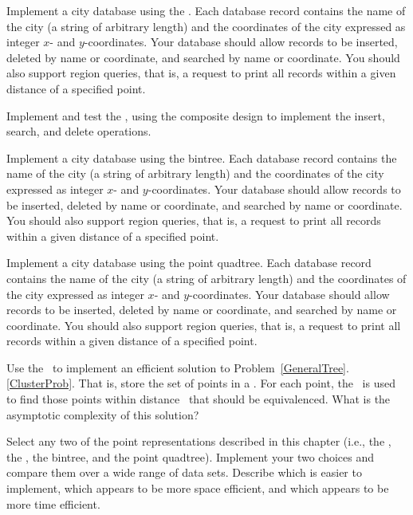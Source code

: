 \begin{projects}
\item
Implement a city database using the
\PRquad.
Each database record contains the name of the city (a string of
arbitrary length) and the coordinates of the city expressed as integer
$x$- and $y$-coordinates.
Your database should allow records to be inserted, deleted by name or
coordinate, and searched by name or coordinate.
You should also support region queries, that is, a request to print
all records within a given distance of a specified point.

\item
Implement and test the \PRquad, using the composite design to
implement the insert, search, and delete operations.

\item
Implement a city database using the
bintree.
Each database record contains the name of the city (a string of
arbitrary length) and the coordinates of the city expressed as integer
$x$- and $y$-coordinates.
Your database should allow records to be inserted, deleted by name or
coordinate, and searched by name or coordinate.
You should also support region queries, that is, a request to print
all records within a given distance of a specified point.

\item
Implement a city database using the
point quadtree.
Each database record contains the name of the city (a string of
arbitrary length) and the coordinates of the city expressed as integer
$x$- and $y$-coordinates.
Your database should allow records to be inserted, deleted by name or
coordinate, and searched by name or coordinate.
You should also support region queries, that is, a request to print
all records within a given distance of a specified point.

\item
Use the \PRquad\ to implement an efficient solution
to
Problem~\ref{GeneralTree}.\ref{ClusterProb}.
That is, store the set of points in a \PRquad.
For each point, the \PRquad\ is used to find those points within
distance~ that should be equivalenced.
What is the asymptotic complexity of this solution?

\item
Select any two of the point representations described in this chapter
(i.e., the \KDtree, the \PRquad, the bintree, and the point quadtree).
Implement your two choices and compare them over a wide range of data
sets.
Describe which is easier to implement, which appears to be more space
efficient, and which appears to be more time efficient.


\end{projects}
